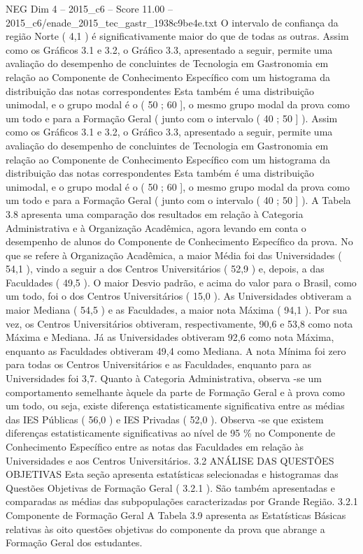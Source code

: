 \begin{textsample}{NEG Dim 4 – 2015\_c6 – Score 11.00 – 2015\_c6/enade\_2015\_tec\_gastr\_1938c9be4e.txt}
O intervalo de confiança da região Norte ( 4,1 ) é significativamente maior do que de todas as outras.
Assim como os Gráficos 3.1 e 3.2, o Gráfico 3.3, apresentado a seguir, permite uma avaliação do desempenho de concluintes de Tecnologia em Gastronomia em relação ao Componente de Conhecimento Específico com um histograma da distribuição das notas correspondentes Esta também é uma distribuição unimodal, e o grupo modal é o ( 50 ; 60 ], o mesmo grupo modal da prova como um todo e para a Formação Geral ( junto com o intervalo ( 40 ; 50 ] ).
Assim como os Gráficos 3.1 e 3.2, o Gráfico 3.3, apresentado a seguir, permite uma avaliação do desempenho de concluintes de Tecnologia em Gastronomia em relação ao Componente de Conhecimento Específico com um histograma da distribuição das notas correspondentes Esta também é uma distribuição unimodal, e o grupo modal é o ( 50 ; 60 ], o mesmo grupo modal da prova como um todo e para a Formação Geral ( junto com o intervalo ( 40 ; 50 ] ).
A Tabela 3.8 apresenta uma comparação dos resultados em relação à Categoria Administrativa e à Organização Acadêmica, agora levando em conta o desempenho de alunos do Componente de Conhecimento Específico da prova.
No que se refere à Organização Acadêmica, a maior Média foi das Universidades ( 54,1 ), vindo a seguir a dos Centros Universitários ( 52,9 ) e, depois, a das Faculdades ( 49,5 ).
O maior Desvio padrão, e acima do valor para o Brasil, como um todo, foi o dos Centros Universitários ( 15,0 ).
As Universidades obtiveram a maior Mediana ( 54,5 ) e as Faculdades, a maior nota Máxima ( 94,1 ).
Por sua vez, os Centros Universitários obtiveram, respectivamente, 90,6 e 53,8 como nota Máxima e Mediana.
Já as Universidades obtiveram 92,6 como nota Máxima, enquanto as Faculdades obtiveram 49,4 como Mediana.
A nota Mínima foi zero para todas os Centros Universitários e as Faculdades, enquanto para as Universidades foi 3,7.
Quanto à Categoria Administrativa, observa -se um comportamento semelhante àquele da parte de Formação Geral e à prova como um todo, ou seja, existe diferença estatisticamente significativa entre as médias das IES Públicas ( 56,0 ) e IES Privadas ( 52,0 ).
Observa -se que existem diferenças estatisticamente significativas ao nível de 95 \% no Componente de Conhecimento Específico entre as notas das Faculdades em relação às Universidades e aos Centros Universitários. 3.2 ANÁLISE DAS QUESTÕES OBJETIVAS Esta seção apresenta estatísticas selecionadas e histogramas das Questões Objetivas de Formação Geral ( 3.2.1 ).
São também apresentadas e comparadas as médias das subpopulações caracterizadas por Grande Região. 3.2.1 Componente de Formação Geral A Tabela 3.9 apresenta as Estatísticas Básicas relativas às oito questões objetivas do componente da prova que abrange a Formação Geral dos estudantes.

\end{textsample}
